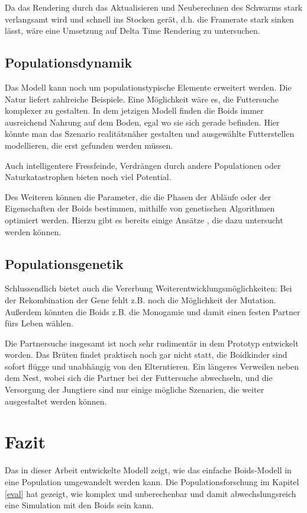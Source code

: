 \documentclass[draft=false
              ,paper=a4
              ,twoside=false
              ,fontsize=11pt
              ,headsepline
              ,BCOR10mm
              ,DIV11
              ,bibtotoc
              ,liststotoc
              ]{scrbook}
\begin{document}
Da das Rendering durch das Aktualisieren und Neuberechnen des Schwarms stark verlangsamt wird und schnell ins Stocken gerät, d.h. die Framerate stark sinken lässt, wäre eine Umsetzung auf Delta Time Rendering zu untersuchen.

\subsection{Populationsdynamik}
Das Modell kann noch um populationstypische Elemente erweitert werden. Die Natur liefert zahlreiche Beispiele. Eine Möglichkeit wäre es, die Futtersuche komplexer zu gestalten. In dem jetzigen Modell finden die Boids immer ausreichend Nahrung auf dem Boden, egal wo sie sich gerade befinden. Hier könnte man das Szenario realitätsnäher gestalten und ausgewählte Futterstellen modellieren, die erst gefunden werden müssen.

Auch intelligentere Fressfeinde, Verdrängen durch andere Populationen oder Naturkatastrophen bieten noch viel Potential.

Des Weiteren können die Parameter, die die Phasen der Abläufe oder der Eigenschaften der Boids bestimmen, mithilfe von genetischen Algorithmen optimiert werden. Hierzu gibt es bereits einige Ansätze \cite{sab92:reynolds}\cite{oai:CiteSeerXPSU:10.1.1.61.9858}\cite{conf/ecms/AlaliyatYS14}, die dazu untersucht werden können.

\subsection{Populationsgenetik}
Schlussendlich bietet auch die Vererbung Weiterentwicklungsmöglichkeiten: Bei der Rekombination der Gene fehlt z.B. noch die Möglichkeit der Mutation. Außerdem könnten die Boids z.B. die Monogamie und damit einen festen Partner fürs Leben wählen.

Die Partnersuche insgesamt ist noch sehr rudimentär in dem Prototyp entwickelt worden. Das Brüten findet praktisch noch gar nicht statt, die Boidkinder sind sofort flügge und unabhängig von den Elterntieren. Ein längeres Verweilen neben dem Nest, wobei sich die Partner bei der Futtersuche abwechseln, und die Versorgung der Jungtiere sind nur einige mögliche Szenarien, die weiter ausgestaltet werden können.

\section{Fazit}
Das in dieser Arbeit entwickelte Modell zeigt, wie das einfache Boids-Modell in eine Population umgewandelt werden kann. Die Populationsforschung im Kapitel \ref{eval} hat gezeigt, wie komplex und unberechenbar und damit abwechslungsreich eine Simulation mit den Boids sein kann. 
\end{document}
